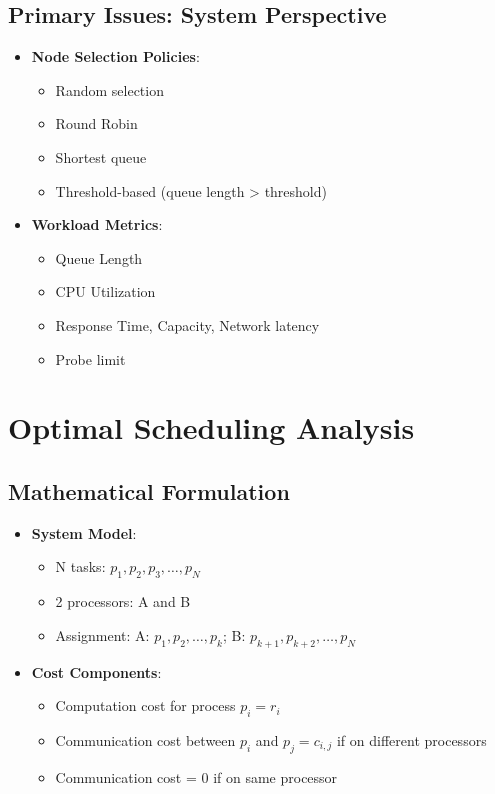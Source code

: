\documentclass[12pt]{article}
\begin{document}
\subsection{Primary Issues: System Perspective}
\begin{itemize}
  \item \textbf{Node Selection Policies}:
        \begin{itemize}
          \item Random selection
          \item Round Robin
          \item Shortest queue
          \item Threshold-based (queue length > threshold)
        \end{itemize}

  \item \textbf{Workload Metrics}:
        \begin{itemize}
          \item Queue Length
          \item CPU Utilization
          \item Response Time, Capacity, Network latency
          \item Probe limit
        \end{itemize}
\end{itemize}

\section{Optimal Scheduling Analysis}

\subsection{Mathematical Formulation}
\begin{itemize}
  \item \textbf{System Model}:
        \begin{itemize}
          \item N tasks: $p_1, p_2, p_3, \ldots, p_N$
          \item 2 processors: A and B
          \item Assignment: A: $p_1, p_2, \ldots, p_k$; B: $p_{k+1}, p_{k+2}, \ldots, p_N$
        \end{itemize}

  \item \textbf{Cost Components}:
        \begin{itemize}
          \item Computation cost for process $p_i = r_i$
          \item Communication cost between $p_i$ and $p_j = c_{i,j}$ if on different processors
          \item Communication cost = 0 if on same processor
        \end{itemize}
\end{itemize}
\end{document}
